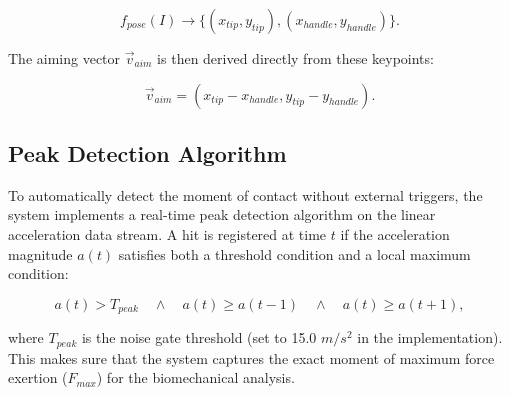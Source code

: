 \begin{equation}
    f_{pose}(I) \rightarrow \{ (x_{tip}, y_{tip}), (x_{handle}, y_{handle}) \}.
\end{equation}

The aiming vector $\vec{v}_{aim}$ is then derived directly from these keypoints: 

\begin{equation}
    \vec{v}_{aim} = {(x_{tip} - x_{handle}, y_{tip} - y_{handle})}.
\end{equation}

\subsection{Peak Detection Algorithm}
To automatically detect the moment of contact without external triggers, the system implements a real-time peak detection algorithm on the linear acceleration data stream. A hit is registered at time $t$ if the acceleration magnitude $a(t)$ satisfies both a threshold condition and a local maximum condition:

\begin{equation}
    a(t) > T_{peak} \quad \land \quad a(t) \geq a(t-1) \quad \land \quad a(t) \geq a(t+1),
\end{equation}

\noindent where $T_{peak}$ is the noise gate threshold (set to 15.0 $m/s^2$ in the implementation). This makes sure that the system captures the exact moment of maximum force exertion ($F_{max}$) for the biomechanical analysis.